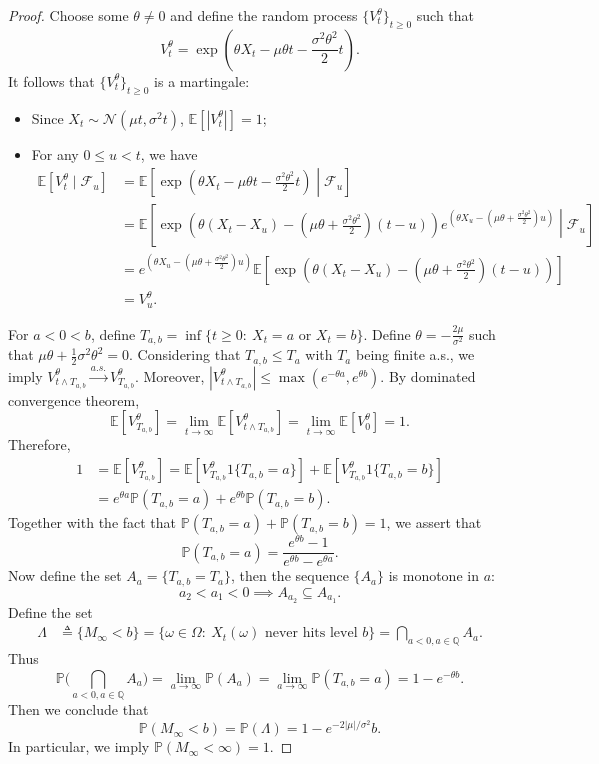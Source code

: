 \begin{proof}
Choose some $\theta\ne0$ and define the random process $\{V_t^\theta\}_{t\ge0}$ such that
\[
V_t^\theta=\exp\left( \theta X_t - \mu\theta t - \frac{\sigma^2\theta^2}{2}t\right).
\]
It follows that $\{V_t^\theta\}_{t\ge0}$ is a martingale:
\begin{itemize}
\item
Since $X_t\sim\mathcal{N}(\mu t,\sigma^2 t)$, $\mathbb{E}[|V_t^\theta|]=1$;
\item
For any $0\le u<t$, we have
\begin{align*}
\mathbb{E}[V_t^\theta\mid\mathcal{F}_u]
&=
\mathbb{E}\left[\exp\left( \theta X_t - \mu\theta t - \frac{\sigma^2\theta^2}{2}t\right)\middle|\mathcal{F}_u\right]\\
&=
\mathbb{E}\left[
\exp\left( \theta(X_t-X_u) - (\mu\theta+\frac{\sigma^2\theta^2}{2})(t -u)\right)
e^{(
\theta X_u - (\mu\theta+\frac{\sigma^2\theta^2}{2})u
)}
\middle|\mathcal{F}_u
\right]\\
&=
e^{(
\theta X_u - (\mu\theta+\frac{\sigma^2\theta^2}{2})u
)}
\mathbb{E}\left[
\exp\left( \theta(X_t-X_u) - (\mu\theta+\frac{\sigma^2\theta^2}{2})(t -u)\right)\right]\\
&=V_u^\theta.
\end{align*}
\end{itemize}
For $a<0<b$, define $T_{a,b}=\inf\{t\ge0:~X_t=a\text{ or }X_t=b\}$.
Define $\theta = -\frac{2\mu}{\sigma^2}$ such that $\mu\theta+\frac{1}{2}\sigma^2\theta^2=0$.
Considering that $T_{a,b}\le T_a$ with $T_a$ being finite a.s., we imply $V_{t\land T_{a,b}}^\theta\xrightarrow{a.s.}V_{T_{a,b}}^\theta$. Moreover, $|V_{t\land T_{a,b}}^\theta|\le \max(e^{-\theta a},e^{\theta b})$. By dominated convergence theorem,
\[
\mathbb{E}[V_{T_{a,b}}^\theta]=\lim_{t\to\infty}
\mathbb{E}[V_{t\land T_{a,b}}^\theta]
=
\lim_{t\to\infty}\mathbb{E}[V_0^\theta]=1.
\]
Therefore,
\begin{align*}
1&=\mathbb{E}[V_{T_{a,b}}^\theta]=\mathbb{E}[V_{T_{a,b}}^\theta1\{T_{a,b}=a\}]
+\mathbb{E}[V_{T_{a,b}}^\theta1\{T_{a,b}=b\}]\\
&=e^{\theta a}\mathbb{P}(T_{a,b}=a) + e^{\theta b}\mathbb{P}(T_{a,b}=b).
\end{align*}
Together with the fact that $\mathbb{P}(T_{a,b}=a)+\mathbb{P}(T_{a,b}=b)=1$, we assert that 
\[\mathbb{P}(T_{a,b}=a)=\frac{e^{\theta b}-1}{e^{\theta b} - e^{\theta a}}.\]
Now define the set $A_a = \{T_{a,b}=T_a\}$, then the sequence $\{A_a\}$ is monotone in $a$:
\[
a_2<a_1<0\implies A_{a_2}\subseteq A_{a_1}.
\]
Define the set 
\begin{align*}
\Lambda&\triangleq\{M_\infty<b\}=\{\omega\in\Omega:~\text{$X_t(\omega)$ never hits level $b$}\}=\bigcap_{a<0,a\in\mathbb{Q}}A_a.
\end{align*}
Thus
\[
\mathbb{P}\bigg(
\bigcap_{a<0,a\in\mathbb{Q}}A_a
\bigg)=\lim_{a\to\infty}\mathbb{P}(A_a)=\lim_{a\to\infty}\mathbb{P}(T_{a,b}=a)=1-e^{-\theta b}.
\]
Then we conclude that 
\[
\mathbb{P}(M_\infty<b)=\mathbb{P}(\Lambda)=1-e^{-2|\mu|/\sigma^2}b.
\]
In particular, we imply $\mathbb{P}(M_\infty<\infty)=1$.
\end{proof}

